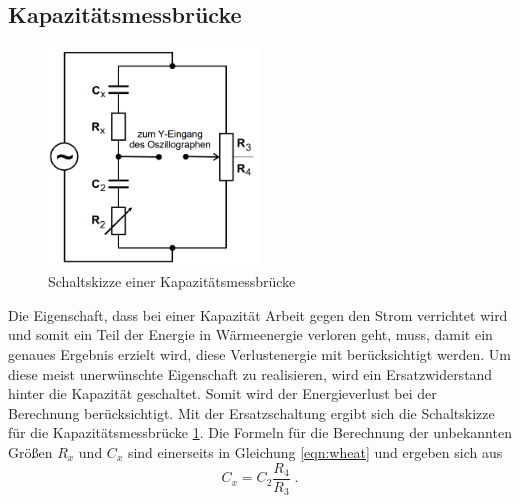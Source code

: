 \subsection{Kapazitätsmessbrücke} \label{subsec:capmesbridge}
\begin{figure}[H]
    \centering  
    \caption{Schaltskizze einer Kapazitätsmessbrücke}
    \label{fig:capmesbridge}
    \includegraphics[width = 0.5\textwidth]{bridges/capmesbridge.png}
\end{figure}
Die Eigenschaft, dass bei einer Kapazität Arbeit gegen den Strom verrichtet wird und somit ein Teil der Energie in Wärmeenergie verloren geht, muss, damit ein genaues
Ergebnis erzielt wird, diese Verlustenergie mit berücksichtigt werden. Um diese meist unerwünschte Eigenschaft zu realisieren, wird ein Ersatzwiderstand 
hinter die Kapazität geschaltet. Somit wird der Energieverlust bei der Berechnung berücksichtigt. Mit der Ersatzschaltung ergibt sich die Schaltskizze 
für die Kapazitätsmessbrücke \ref{fig:capmesbridge}. Die Formeln für die Berechnung der unbekannten Größen $R_x$ und $C_x$ sind einerseits in Gleichung
\eqref{eqn:wheat} und ergeben sich aus 
\begin{equation}
    C_x = C_2 \frac{R_4}{R_3} \label{eqn:capmes} \; \text{.}
\end{equation}
